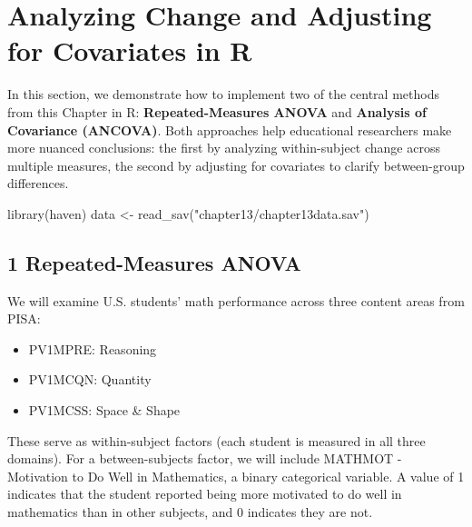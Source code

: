\documentclass[
  letterpaper,
  DIV=11,
  numbers=noendperiod]{scrreprt}
\newenvironment{Shaded}{\begin{snugshade}}{\end{snugshade}}
\newcommand{\FunctionTok}[1]{\textcolor[rgb]{0.28,0.35,0.67}{#1}}
\newcommand{\NormalTok}[1]{\textcolor[rgb]{0.00,0.23,0.31}{#1}}
\newcommand{\OtherTok}[1]{\textcolor[rgb]{0.00,0.23,0.31}{#1}}
\newcommand{\StringTok}[1]{\textcolor[rgb]{0.13,0.47,0.30}{#1}}
\begin{document}
\chapter*{Analyzing Change and Adjusting for Covariates in
R}\label{analyzing-change-and-adjusting-for-covariates-in-r}


In this section, we demonstrate how to implement two of the central
methods from this Chapter in R: \textbf{Repeated-Measures ANOVA} and
\textbf{Analysis of Covariance (ANCOVA)}. Both approaches help
educational researchers make more nuanced conclusions: the first by
analyzing within-subject change across multiple measures, the second by
adjusting for covariates to clarify between-group differences.

\begin{Shaded}
\begin{Highlighting}[]
\FunctionTok{library}\NormalTok{(haven) }
\NormalTok{data }\OtherTok{\textless{}{-}} \FunctionTok{read\_sav}\NormalTok{(}\StringTok{"chapter13/chapter13data.sav"}\NormalTok{) }
\end{Highlighting}
\end{Shaded}

\section*{1 Repeated-Measures ANOVA}\label{repeated-measures-anova}


We will examine U.S. students' math performance across three content
areas from PISA:

\begin{itemize}
\item
  PV1MPRE: Reasoning
\item
  PV1MCQN: Quantity
\item
  PV1MCSS: Space \& Shape
\end{itemize}

These serve as within-subject factors (each student is measured in all
three domains). For a between-subjects factor, we will include MATHMOT -
Motivation to Do Well in Mathematics, a binary categorical variable. A
value of 1 indicates that the student reported being more motivated to
do well in mathematics than in other subjects, and 0 indicates they are
not.
\end{document}
